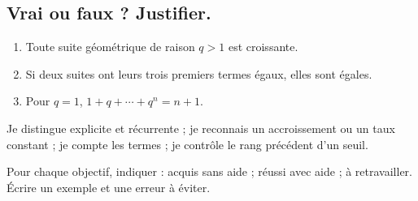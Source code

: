 \subsection*{Vrai ou faux ? Justifier.}\label{C01-VF}
\begin{enumerate}
\item Toute suite géométrique de raison $q>1$ est croissante.
\item Si deux suites ont leurs trois premiers termes égaux, elles sont égales.
\item Pour $q=1$, $1+q+\cdots+q^n=n+1$.
\end{enumerate}
\begin{keypoint}Je distingue explicite et récurrente ; je reconnais un accroissement ou un taux constant ; je compte les termes ; je contrôle le rang précédent d’un seuil.

Pour chaque objectif, indiquer : acquis sans aide ; réussi avec aide ; à retravailler. Écrire un exemple et une erreur à éviter.\end{keypoint}
\endgroup
\ifmxteacher{}\fi
